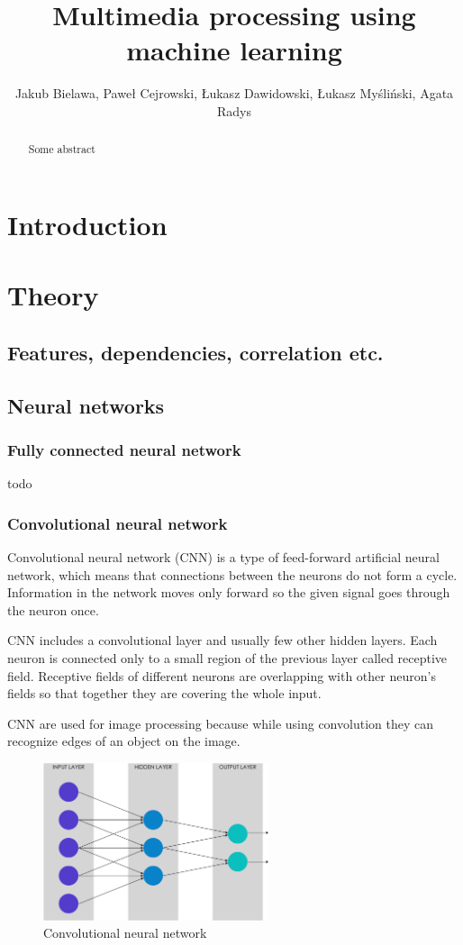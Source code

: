 \documentclass[journal, a4paper]{IEEEtran}
\begin{document}
	\title{Multimedia processing using machine learning}
	\author{Jakub Bielawa, Paweł Cejrowski, Łukasz Dawidowski, Łukasz Myśliński, Agata Radys}
	\maketitle

\begin{abstract}
Some abstract
\end{abstract}

\section{Introduction}
\section{Theory}
\subsection{Features, dependencies, correlation etc.}
\subsection{Neural networks}
\subsubsection{Fully connected neural network}
todo
\subsubsection{Convolutional neural network}
Convolutional neural network (CNN) is a type of feed-forward artificial neural network, which means that connections between the neurons do not form a cycle. Information in the network moves only forward so the given signal goes through the neuron once.
\par CNN includes a convolutional layer and usually few other hidden layers. Each neuron is connected only to a small region of the previous layer called receptive field. Receptive fields of different neurons are overlapping with other neuron's fields so that together they are covering the whole input.
\par CNN are used for image processing because while using convolution they can recognize edges of an object on the image.
\begin{figure}[H]
\centering
\includegraphics[width=250px]{pictures/cnn.png}
\caption{Convolutional neural network}
\end{figure}
\end{document}
